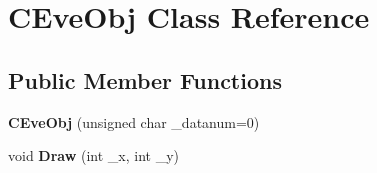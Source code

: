\hypertarget{class_c_eve_obj}{}\section{C\+Eve\+Obj Class Reference}
\label{class_c_eve_obj}
\subsection*{Public Member Functions}
\begin{DoxyCompactItemize}
\item 
{\bfseries C\+Eve\+Obj} (unsigned char \+\_\+datanum=0)\hypertarget{class_c_eve_obj_a25c68cb9fa77435cef1fb063b47d6230}{}\label{class_c_eve_obj_a25c68cb9fa77435cef1fb063b47d6230}

\item 
void {\bfseries Draw} (int \+\_\+x, int \+\_\+y)\hypertarget{class_c_eve_obj_a46c8ef453357ea0299483afe1d96f329}{}\label{class_c_eve_obj_a46c8ef453357ea0299483afe1d96f329}

\end{DoxyCompactItemize}

